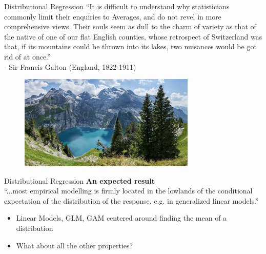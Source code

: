 \documentclass[t]{beamer} 	%
\begin{document}
\begin{frame}{Distributional Regression}
	``It is difficult to understand why statisticians commonly limit their enquiries to
Averages, and do not revel in more comprehensive views. Their souls seem as dull to
the charm of variety as that of the native of one of our flat English counties, whose retrospect of Switzerland was that, if its mountains could be thrown into its lakes, two nuisances would be got rid of at once.'' \\
- Sir Francis Galton (England, 1822-1911)
\begin{figure}
	\includegraphics[width=0.75\textwidth]{images/oeschinensee.jpg}
\end{figure}
\end{frame}

\begin{frame}{Distributional Regression}
	\textbf{An expected result} \\
	``...most empirical modelling is firmly located in the lowlands of the conditional expectation of the distribution of the response, e.g. in generalized linear models.'' \\ 
	\citep{rage_mean}
	\begin{itemize}
		\item Linear Models, GLM, GAM centered around finding the mean of a distribution
		\item What about all the other properties?
	\end{itemize}
\end{frame}


\end{document}
